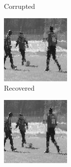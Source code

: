 \begin{figure}
\begin{subfigure}{0.4\textwidth}
    \caption{Corrupted}
  \end{subfigure}
  \begin{subfigure}{0.4\textwidth}
    \centering
    \includegraphics[width=.9\textwidth]{Chapter7/Images/soccer40_rec_11.png}
    \caption{Recovered}
  \end{subfigure}
  \begin{subfigure}{0.4\textwidth}
    \centering
    \includegraphics[width=.9\textwidth]{Chapter7/Images/soccer40_rec_12.png}

\end{subfigure}
\end{figure}
